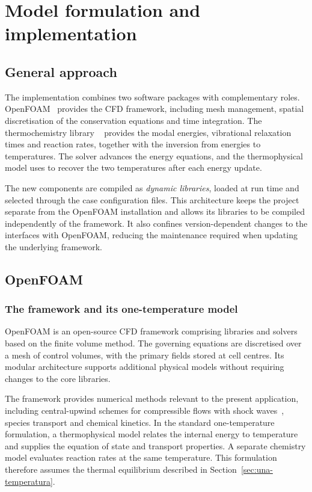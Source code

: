 \section{Model formulation and implementation}
\label{sec:lavoro}

\subsection{General approach}
\label{sec:approccio}

The implementation combines two software packages with complementary roles.
OpenFOAM~\cite{openfoam13} provides the CFD framework, including mesh
management, spatial discretisation of the conservation equations and time
integration. The thermochemistry library \mpp~\cite{scoggins2020} provides
the modal energies, vibrational relaxation times and reaction rates, together
with the inversion from energies to temperatures. The solver advances the
energy equations, and the thermophysical model uses \mpp{} to recover the
two temperatures after each energy update.

The new components are compiled as \emph{dynamic libraries}, loaded at run
time and selected through the case configuration files. This architecture
keeps the project separate from the OpenFOAM installation and allows its
libraries to be compiled independently of the framework. It also confines
version-dependent changes to the interfaces with OpenFOAM, reducing the
maintenance required when updating the underlying framework.

\subsection{OpenFOAM}
\label{sec:openfoam}

\subsubsection{The framework and its one-temperature model}
\label{sec:openfoam-moduli}

OpenFOAM is an open-source CFD framework comprising
libraries and solvers based on the finite volume method. The governing
equations are discretised over a mesh of control volumes, with the primary
fields stored at cell centres. Its modular architecture supports additional
physical models without requiring changes to the core libraries.

The framework provides numerical methods relevant to the present application,
including central-upwind schemes for compressible flows with shock
waves~\cite{kurganov2001,greenshields2010}, species transport and chemical
kinetics. In the standard one-temperature formulation, a thermophysical model
relates the internal energy to temperature and supplies the equation of state
and transport properties. A separate chemistry model evaluates reaction rates
at the same temperature. This formulation therefore assumes the thermal
equilibrium described in Section~\ref{sec:una-temperatura}.

